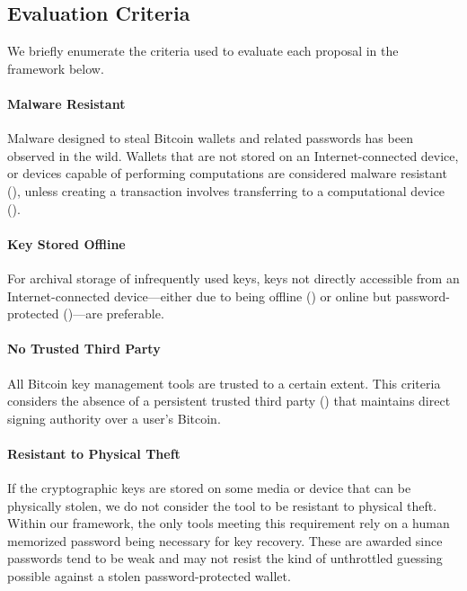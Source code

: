 \subsection{Evaluation Criteria}
We briefly enumerate the criteria used to evaluate each proposal in the framework below. 

\paragraph{Malware Resistant}
\label{Malware Resistant}
Malware designed to steal Bitcoin wallets and related passwords has been observed in the wild. Wallets that are not stored on an Internet-connected device, or devices capable of performing computations are considered malware resistant (\full), unless creating a transaction involves transferring to a computational device (\prt). 

\paragraph{Key Stored Offline}
\label{Key Kept Offline}
For archival storage of infrequently used keys, keys not directly accessible from an Internet-connected device---either due to being offline (\full) or online but password-protected (\prt)---are preferable. 

\paragraph{No Trusted Third Party}
\label{No Trusted Third Party}
All Bitcoin key management tools are trusted to a certain extent. 
This criteria considers the absence of a persistent trusted third party (\full) that maintains direct signing authority over a user's Bitcoin. 

\paragraph{Resistant to Physical Theft}
\label{Resistant to Physical Theft}
If the cryptographic keys are stored on some media or device that can be physically stolen, we do not consider the tool to be resistant to physical theft. Within our framework, the only tools meeting this requirement rely on a human memorized password being necessary for key recovery. These are awarded \prt since passwords tend to be weak and may not resist the kind of unthrottled guessing possible against a stolen password-protected wallet. 

